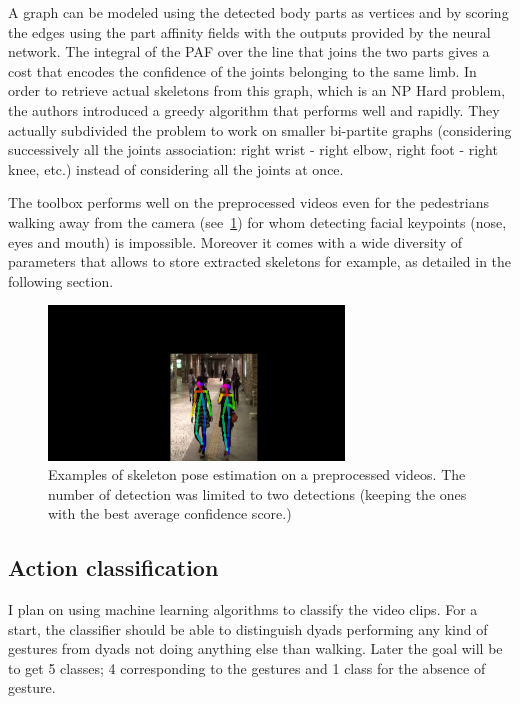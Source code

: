 \documentclass[12pt,a4paper,twoside]{article}
\begin{document}
A graph can be modeled using the detected body parts as vertices and by scoring the edges using the part affinity fields with the outputs provided by the neural network. The integral of the PAF over the line that joins the two parts gives a cost that encodes the confidence of the joints belonging to the same limb. In order to retrieve actual skeletons from this graph, which is an NP Hard problem, the authors  introduced a greedy algorithm that performs well and rapidly. They actually subdivided the problem to work on smaller bi-partite graphs (considering successively all the joints association: right wrist - right elbow, right foot - right knee, etc.) instead of considering all the joints at once.

The toolbox performs well on the preprocessed videos even for the pedestrians walking away from the camera (see~\ref{fig:skeleton}) for whom detecting facial keypoints (nose, eyes and mouth) is impossible. Moreover it comes with a wide diversity of parameters that allows to store extracted skeletons for example, as detailed in the following section.

\begin{figure}
    \centering
        \includegraphics[width=0.7\textwidth]{images/dyad_rendered}
    \caption{Examples of skeleton pose estimation on a preprocessed videos. The number of detection was limited to two detections (keeping the ones with the best average confidence score.)}
    \label{fig:skeleton}
\end{figure}

\subsection{Action classification}
I plan on using machine learning algorithms to classify the video clips. For a start, the classifier should be able to distinguish dyads performing any kind of gestures from dyads not doing anything else than walking. Later the goal will be to get 5 classes; 4 corresponding to the gestures and 1 class for the absence of gesture.
\end{document}
